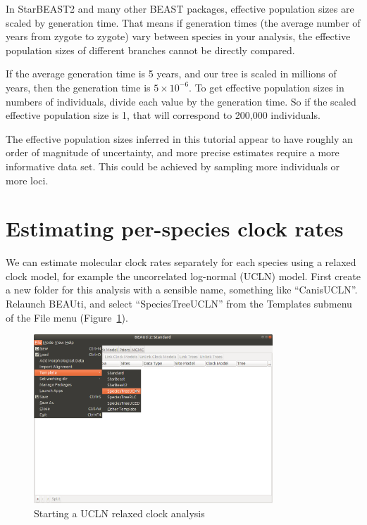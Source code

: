 \documentclass[12pt]{article}
\begin{document}
In StarBEAST2 and many other BEAST packages, effective population sizes are
scaled by generation time. That means if generation times (the average
number of years from zygote to zygote) vary between species in your
analysis, the effective population sizes of different branches cannot be
directly compared.

If the average generation time is 5 years, and our tree is scaled in millions
of years, then the generation time is $5\times10^{-6}$. To get effective
population sizes in numbers of individuals, divide each value by the
generation time. So if the scaled effective population size is 1, that
will correspond to 200,000 individuals.

The effective population sizes inferred in this tutorial appear to have
roughly an order of magnitude of uncertainty, and more precise estimates require
a more informative data set. This could be achieved by sampling more
individuals or more loci.

\section{Estimating per-species clock rates}
\label{sec:relaxedClock}

We can estimate molecular clock rates separately for each species using
a relaxed clock model, for example the uncorrelated log-normal (UCLN) model.
First create a new folder for this analysis with a sensible name, something
like ``CanisUCLN''. Relaunch BEAUti, and select ``SpeciesTreeUCLN'' from the
Templates submenu of the File menu (Figure~\ref{fig:speciesTreeUCLN}).

\begin{figure}[htb!]
\centering
\includegraphics[width=0.8\textwidth]{figures/speciesTreeUCLN.png}
\caption
{Starting a UCLN relaxed clock analysis}
\label{fig:speciesTreeUCLN}
\end{figure}
\end{document}
